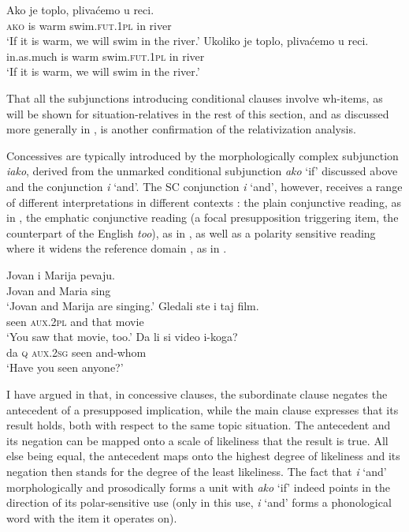 \documentclass[output=paper]{langscibook}
\begin{document}
\ea\label{ex:Cond-clauses1}
    \ea \gll Ako je toplo, plivaćemo u reci.\\
    \textsc{ako} is warm swim.\textsc{fut.1pl} in river\\
    \glt `If it is warm, we will swim in the river.'\label{ex:Cond-clauses-a}
	\ex \gll Ukoliko je toplo, plivaćemo u reci.\\
    in.as.much is warm swim.\textsc{fut.1pl} in river\\
    \glt `If it is warm, we will swim in the river.'\label{ex:Cond-clauses-b}
\z\z

\noindent That all the subjunctions introducing conditional clauses involve wh-items, as will be shown for situation-relatives in the rest of this section, and as discussed more generally in \citet{Arsenijevic2006}, is another confirmation of the relativization analysis.

Concessives are typically introduced by the morphologically complex subjunction \textit{iako}, derived from the unmarked conditional subjunction \textit{ako} `if' discussed above and the conjunction \textit{i} `and'. The SC conjunction \textit{i} `and', however, receives a range of different interpretations in different contexts \citep{Arsenijevic2011}: the plain conjunctive reading, as in , the emphatic conjunctive reading (a focal presupposition triggering item, the counterpart of the English \textit{too}), as in , as well as a polarity sensitive reading where it widens the reference domain \citep{Chierchia2006}, as in .

\ea\label{ex:i-uses1}
    \ea \gll Jovan i Marija pevaju.\\
    Jovan and Maria sing\\
    \glt `Jovan and Marija are singing.'\label{ex:i-uses-a}
	\ex \gll Gledali ste i taj film.\\
    seen \textsc{aux.2pl} and that movie\\
    \glt `You saw that movie, too.'\label{ex:i-uses-b}
	\ex \gll Da li si video i-koga?\\
    da \textsc{q} \textsc{aux.2sg} seen and-whom\\
    \glt `Have you seen anyone?'\label{ex:i-uses-c}
\z\z

\noindent I have argued in  that, in concessive clauses, the subordinate clause negates the antecedent of a presupposed implication, while the main clause expresses that its result holds, both with respect to the same topic situation. The antecedent and its negation can be mapped onto a scale of likeliness that the result is true. All else being equal, the antecedent maps onto the highest degree of likeliness and its negation then stands for the degree of the least likeliness. The fact that \textit{i} `and' morphologically and prosodically forms a unit with \textit{ako} `if' indeed points in the direction of its polar-sensitive use (only in this use, \textit{i} `and' forms a phonological word with the item it operates on).
\end{document}
